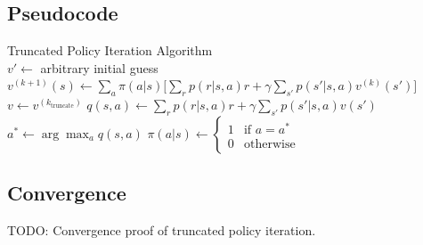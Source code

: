     \subsection{Pseudocode}
        {Truncated Policy Iteration Algorithm}
        { \\
         }
        {}
        {
            {
                $v' \leftarrow$ arbitrary initial guess\;
                {
                    {
                        $v^{(k+1)}(s) \leftarrow \sum_a\pi(a|s)\Big[ \sum_r p(r|s,a)r + \gamma \sum_{s'}p(s'|s,a)v^{(k)}(s') \Big]$\;
                    }
                }
                $v \leftarrow v^{(k_{\text{truncate}})}$\;
                {
                    {
                        $q(s,a) \leftarrow \sum_r p(r|s,a)r + \gamma \sum_{s'}p(s'|s,a)v(s')$\;
                    }
                    $a^* \leftarrow \arg\max_a q(s,a)$\;
                    $\pi(a|s) \leftarrow
                    \begin{cases}
                        1 &\text{if $a=a^*$} \\
                        0 &\text{otherwise}
                    \end{cases}$\;
                }
            }
        }
    \subsection{Convergence}
    TODO: Convergence proof of truncated policy iteration.